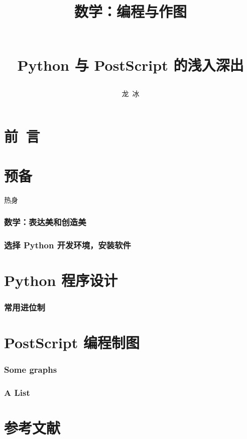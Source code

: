 \documentclass[zihao=-4,linespread=1.5,heading=true,a4paper,twoside]{ctexbook}
\title{\begin{kaishu}数学：编程与作图\end{kaishu}\\
	Python 与 PostScript 的浅入深出}
\author{\kaishu 龙\,  冰}
\begin{document}
\begin{titlepage}
	\maketitle
\end{titlepage}

\part*{\kaishu 前\, 言}\label{sec:preface}


\newpage\tableofcontents

\newpage\part{预备}
热身
\section{数学：表达美和创造美}\label{sec:I.1}




\section{选择 Python 开发环境，安装软件}\label{sec:II.2}


\newpage\part{Python 程序设计}
\section{常用进位制}\label{sec:II.2}



\newpage\part{PostScript 编程制图}
\section{Some graphs}


\section{A List}


\newpage\part*{参考文献}
\printbibliography[heading=none]
\end{document}
